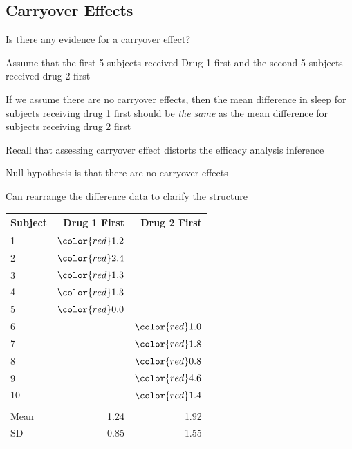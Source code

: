 \subsection{Carryover Effects}

\bi
   \item Is there any evidence for a carryover effect?
   \item Assume that the first 5 subjects received Drug 1 first and the second 5 subjects received drug 2 first
   \item If we assume there are no carryover effects, then the mean difference in sleep for subjects receiving drug 1 first should be \textit{the same} as the mean difference for subjects receiving drug 2 first
   \item Recall that assessing carryover effect distorts the efficacy
     analysis inference
   \item Null hypothesis is that there are no carryover effects
   \item Can rearrange the difference data to clarify the structure
\ei

\begin{table}[!hbp]
 \begin{center}
 \begin{tabular}{lrr}\hline\hline
Subject & Drug 1 First & Drug 2 First
\\ \hline
1 & $\color{red}1.2$ & \\
2 & $\color{red}2.4$ & \\
3 & $\color{red}1.3$ & \\
4 & $\color{red}1.3$ & \\
5 & $\color{red}0.0$ & \\
6 & & $\color{red}1.0$\\
7 & & $\color{red}1.8$\\
8 & & $\color{red}0.8$\\
9 & & $\color{red}4.6$\\
10 & & $\color{red}1.4$\\ \\
Mean & 1.24 & 1.92 \\
SD & 0.85 & 1.55 \\
\hline
\end{tabular}
\end{center}
\end{table}


